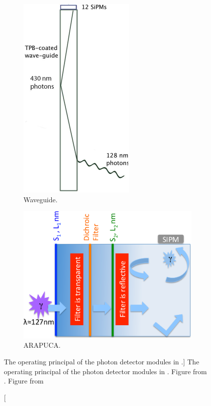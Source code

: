 \begin{figure}

	\centering

	\begin{subfigure}[b]{0.28\textwidth}
		\centering
		\includegraphics[height=0.3\textheight]{figures/pdsp_pd.pdf}
		\caption{Waveguide.}
		\label{fig:pd_bars}
	\end{subfigure}
	\hfill
	\begin{subfigure}[b]{0.67\textwidth}
		\centering
		\includegraphics[height=0.3\textheight]{figures/pdsp_arapuca.png}
		\caption{ARAPUCA.}
		\label{fig:arapuca}
	\end{subfigure}

	\caption
	[The operating principal of the photon detector modules in \protodune{}.]
	{The operating principal of the photon detector modules in \protodune{}.
	Figure  from \cite{Abi2017}. Figure  
	from \cite{Machado:2016jqe}}

	\label{fig:pdsp_pd}

\end{figure}

